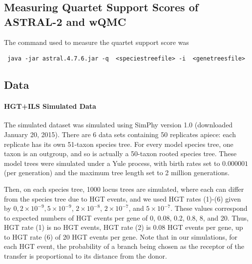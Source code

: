 \subsection{Measuring Quartet Support Scores of ASTRAL-2 and wQMC}

\noindent The command used to measure the quartet support score was

 \begin{verbatim} java -jar astral.4.7.6.jar -q  <speciestreefile> -i  <genetreesfile>   \end{verbatim}



\subsection{Data}

\paragraph{HGT+ILS Simulated Data}

The simulated dataset was simulated using SimPhy \cite{SimPhy} version 1.0
(downloaded January 20, 2015).   There are 6 data sets containing 50 replicates apiece: each replicate has its own 51-taxon species tree.  For every model species tree, one taxon is an outgroup, and so is actually a 50-taxon rooted species tree.  These model trees were simulated under a Yule process, with birth rates set to $0.000001$ (per generation) and the maximum tree length set to 2 million generations.  

Then, on each species tree, 
1000 locus trees are simulated, where each can differ from the species tree due to HGT events, and we used HGT rates (1)-(6) given by
$0, 2 \times 10^{-9}, 5 \times 10^{-9}$, $2 \times 10^{-8}$, $2 \times 10^{-7}$, and $5 \times 10^{-7}$.  These values correspond to expected numbers of HGT events per gene of 0, 0.08, 0.2, 0.8, 8, and 20. Thus, 
HGT rate (1) is no  HGT  events, 
HGT rate (2) is 0.08 HGT events per gene, up to HGT rate (6) of 20
HGT events per gene. 
Note that in our simulations, 
for each HGT event, the probability of a branch being chosen as the 
receptor of the transfer is proportional to its distance from the donor. 

